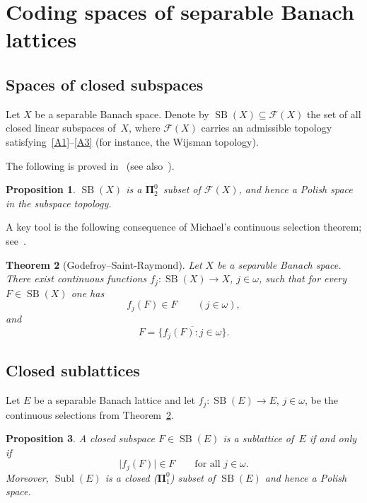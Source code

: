 \documentclass[12pt]{amsart}
\theoremstyle{plain}
\newtheorem{theorem}{Theorem}[section]
\newtheorem{proposition}[theorem]{Proposition}
\theoremstyle{definition}
\theoremstyle{remark}
\DeclareMathOperator{\SB}{SB}
\DeclareMathOperator{\Subl}{Subl}
\begin{document}
\section{Coding spaces of separable Banach lattices}\label{sec:coding}

\subsection{Spaces of closed subspaces}\label{subsec:SB}

Let $X$ be a separable Banach space.  Denote by $\SB(X) \subseteq \mathcal{F}(X)$
the set of all closed linear subspaces of~$X$, where $\mathcal{F}(X)$ carries an
admissible topology satisfying~\ref{A1}--\ref{A3}
(for instance, the Wijsman topology).

The following is proved in~\cite{God2018Cod} (see
also~\cite[Chapter~2]{Dod2010Ban}).

\begin{proposition}\label{prop:SB-Polish}
$\SB(X)$ is a $\boldsymbol{\Pi}^0_2$~subset of $\mathcal{F}(X)$, and hence a
Polish space in the subspace topology.
\end{proposition}

A key tool is the following consequence of Michael's continuous selection theorem;
see~\cite[Theorem~4.1]{God2018Cod}.

\begin{theorem}[Godefroy--Saint-Raymond]\label{thm:selection}
Let $X$ be a separable Banach space.  There exist continuous functions
$f_j \colon \SB(X) \to X$, $j \in \omega$, such that for every
$F \in \SB(X)$ one has
\[
    f_j(F) \in F \qquad (j \in \omega),
\]
and
\[
    F = \overline{\{f_j(F) \colon j \in \omega\}}.
\]
\end{theorem}

\subsection{Closed sublattices}\label{subsec:subl}

Let $E$ be a separable Banach lattice and let $f_j \colon \SB(E) \to E$,
$j \in \omega$, be the continuous selections from Theorem~\ref{thm:selection}.

\begin{proposition}\label{prop:subl}
A closed subspace $F \in \SB(E)$ is a sublattice of~$E$ if and only if
\begin{equation}\label{eq:subl-cond}
    \lvert f_j(F) \rvert \in F \qquad \text{for all } j \in \omega.
\end{equation}
Moreover, $\Subl(E)$ is a closed ($\boldsymbol{\Pi}^0_1$) subset of $\SB(E)$
and hence a Polish space.
\end{proposition}
\end{document}
